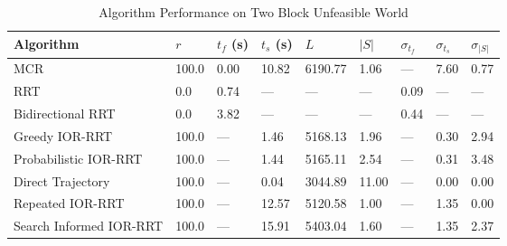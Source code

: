 \begin{table}[h!]
\centering
{}
\caption{Algorithm Performance on Many Obstacles Feasible World}
\label{tab:many_obstacles_feasible_world}
\end{table}

\begin{table}[h!]
\centering
\begin{tabular}{@{}lllllllll@{}}
\toprule
Algorithm & $r$ & $t_f$ (s) & $t_s$ (s) & $L$ & $|S|$ & $\sigma_{t_f}$ & $\sigma_{t_s}$ & $\sigma_{|S|}$ \\
\midrule
MCR & 100.0 & 0.00 & 10.82 & 6190.77 & 1.06 & --- & 7.60 & 0.77 \\
RRT & 0.0 & 0.74 & --- & --- & --- & 0.09 & --- & --- \\
Bidirectional RRT & 0.0 & 3.82 & --- & --- & --- & 0.44 & --- & --- \\
Greedy IOR-RRT & 100.0 & --- & 1.46 & 5168.13 & 1.96 & --- & 0.30 & 2.94 \\
Probabilistic IOR-RRT & 100.0 & --- & 1.44 & 5165.11 & 2.54 & --- & 0.31 & 3.48 \\
Direct Trajectory & 100.0 & --- & 0.04 & 3044.89 & 11.00 & --- & 0.00 & 0.00 \\
Repeated IOR-RRT & 100.0 & --- & 12.57 & 5120.58 & 1.00 & --- & 1.35 & 0.00 \\
Search Informed IOR-RRT & 100.0 & --- & 15.91 & 5403.04 & 1.60 & --- & 1.35 & 2.37 \\
\bottomrule
\end{tabular}
\caption{Algorithm Performance on Two Block Unfeasible World}
\label{tab:two_soda_world}
\end{table}

